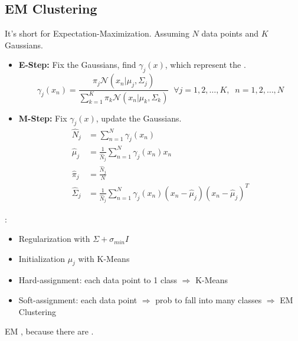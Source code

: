 \subsection{EM Clustering}
It's short for Expectation-Maximization. Assuming $N$ data points and $K$ Gaussians.
\begin{itemize}
	\item \textbf{E-Step:} Fix the Gaussians, find $\gamma_j(x)$, which represent the .
	\begin{equation}
		\gamma_j(x_n) = \frac{\pi_j \mathcal{N}\left(x_n|\mu_j,\Sigma_j\right)}
		{\sum_{k=1}^{K}\pi_k \mathcal{N}\left(x_n|\mu_k,\Sigma_k\right)} \;\;\forall j=1, 2, \dots, K, \;\; n=1, 2, \dots, N
	\end{equation}	
	\item \textbf{M-Step:} Fix $\gamma_j(x)$, update the Gaussians.
	\begin{align}
		\hat{N}_j &= \sum_{n=1}^{N}\gamma_j(x_n) \\
		\hat{\mu}_j &= \frac{1}{\hat{N}_j} \sum_{n=1}^{N} \gamma_j(x_n)x_n \\
		\hat{\pi}_j &= \frac{\hat{N}_j}{N} \\
		\hat{\Sigma}_j &= \frac{1}{\hat{N}_j} \sum_{n=1}^{N} \gamma_j(x_n) \left(x_n - \hat{\mu}_j\right)\left(x_n - \hat{\mu}_j\right)^T
	\end{align}
\end{itemize}
:
\begin{itemize}
	\item Regularization with $\Sigma + \sigma_{min}I$
	\item Initialization $\mu_j$ with K-Means
	\item Hard-assignment: each data point to 1 class $\Rightarrow$ K-Means
	\item Soft-assignment: each data point $\Rightarrow$ \ac{prob} to fall into many classes $\Rightarrow$ EM Clustering
\end{itemize}

EM , because there are .